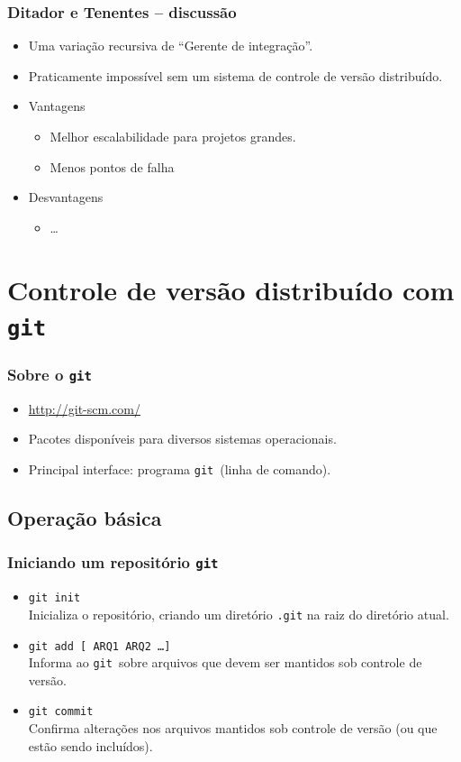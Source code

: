 \documentclass{beamer}
\newcommand{\git}{\texttt{git}}
\begin{document}
\begin{frame}
  \frametitle{Ditador e Tenentes -- discussão}
  \begin{itemize}
    \item Uma variação recursiva de ``Gerente de integração''.
    \item Praticamente impossível sem um sistema de controle de versão
      distribuído.
    \item Vantagens
      \begin{itemize}
        \item<2-> Melhor escalabilidade para projetos grandes.
        \item<3-> Menos pontos de falha
      \end{itemize}
    \item Desvantagens
      \begin{itemize}
        \item<4-> \ldots
      \end{itemize}
  \end{itemize}
\end{frame}

\section[\git]{Controle de versão distribuído com \git}

\begin{frame}
  \frametitle{Sobre o \git}
  \begin{itemize}
    \item \url{http://git-scm.com/}
    \item Pacotes disponíveis para diversos sistemas operacionais.
    \item Principal interface: programa \git\ (linha de comando).
  \end{itemize}
\end{frame}

\subsection{Operação básica}

\begin{frame}
  \frametitle{Iniciando um repositório \git}
  \begin{itemize}
    \item \texttt{git init}\\
      Inicializa o repositório, criando um diretório \texttt{.git} na
      raiz do diretório atual.
      \pause

    \item \texttt{git add [ ARQ1 ARQ2 \ldots ]}\\
      Informa ao \git\ sobre arquivos que devem ser mantidos sob controle
      de versão.
      \pause

    \item \texttt{git commit}\\
      Confirma alterações nos arquivos mantidos sob controle de versão
      (ou que estão sendo incluídos).
  \end{itemize}
\end{frame}
\end{document}
